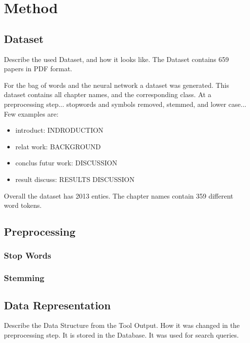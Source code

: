 \chapter{Method}
\label{cha:method}

\section{Dataset}
\label{sec:dataset}

Describe the used Dataset, and how it looks like.
The Dataset contains 659 papers in PDF format.

For the bag of words and the neural network a dataset was generated. This dataset contains all chapter names, and the corresponding class. 
At a preprocessing step... stopwords and symbols removed, stemmed, and lower case... Few examples are:

\begin{itemize}[label={}]
  \item introduct: INDRODUCTION
  \item relat work: BACKGROUND
  \item conclus futur work: DISCUSSION
  \item result discuss: RESULTS DISCUSSION
\end{itemize}

Overall the dataset has 2013 enties. The chapter names contain 359 different word tokens.

\section{Preprocessing}
\label{sec:preprocessing}

\subsection{Stop Words}
\label{subsec:stop-words}

\subsection{Stemming}
\label{subsec:stemming}

\section{Data Representation}
\label{sec:data-representation}

Describe the Data Structure from the Tool Output. How it was changed in the preprocessing step. It is stored in the Database. It was used for search queries.  

